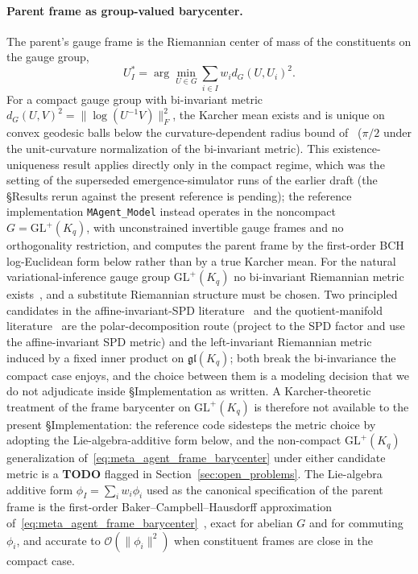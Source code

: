 \documentclass[11pt]{article}
\begin{document}
\paragraph{Parent frame as group-valued barycenter.} The parent's gauge frame is the Riemannian center of mass of the constituents on the gauge group,
\begin{equation}
U_I^* = \arg\min_{U \in G} \sum_{i \in I} w_i d_G(U, U_i)^2.
\label{eq:meta_agent_frame_barycenter}
\end{equation}
For a compact gauge group with bi-invariant metric $d_G(U, V)^2 = \|\log(U^{-1}V)\|_F^2$, the Karcher mean exists and is unique on convex geodesic balls below the curvature-dependent radius bound of~\cite{Karcher1977, Pennec2009} ($\pi/2$ under the unit-curvature normalization of the bi-invariant metric). This existence-uniqueness result applies directly only in the compact regime, which was the setting of the superseded emergence-simulator runs of the earlier draft (the §Results rerun against the present reference is pending); the reference implementation \texttt{MAgent\_Model} instead operates in the noncompact $G = \mathrm{GL}^+(K_q)$, with unconstrained invertible gauge frames and no orthogonality restriction, and computes the parent frame by the first-order BCH log-Euclidean form below rather than by a true Karcher mean. For the natural variational-inference gauge group $\mathrm{GL}^+(K_q)$ no bi-invariant Riemannian metric exists~\cite{Milnor1976}, and a substitute Riemannian structure must be chosen. Two principled candidates in the affine-invariant-SPD literature~\cite{PennecFillardAyache2006} and the quotient-manifold literature~\cite{BonnabelSepulchre2009} are the polar-decomposition route (project to the SPD factor and use the affine-invariant SPD metric) and the left-invariant Riemannian metric induced by a fixed inner product on $\mathfrak{gl}(K_q)$; both break the bi-invariance the compact case enjoys, and the choice between them is a modeling decision that we do not adjudicate inside §Implementation as written. A Karcher-theoretic treatment of the frame barycenter on $\mathrm{GL}^+(K_q)$ is therefore not available to the present §Implementation: the reference code sidesteps the metric choice by adopting the Lie-algebra-additive form below, and the non-compact $\mathrm{GL}^+(K_q)$ generalization of~\eqref{eq:meta_agent_frame_barycenter} under either candidate metric is a \textbf{TODO} flagged in Section~\ref{sec:open_problems}. The Lie-algebra additive form $\phi_I = \sum_i w_i \phi_i$ used as the canonical specification of the parent frame is the first-order Baker--Campbell--Hausdorff approximation of~\eqref{eq:meta_agent_frame_barycenter}~\cite{Hall2015}, exact for abelian $G$ and for commuting $\phi_i$, and accurate to $\mathcal{O}(\|\phi_i\|^2)$ when constituent frames are close in the compact case.
\end{document}
